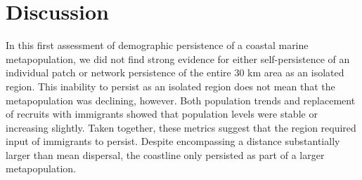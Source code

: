 \documentclass[12pt, oneside]{article}   	%
\begin{document}

\section*{Discussion}

In this first assessment of demographic persistence of a coastal marine metapopulation, we did not find strong evidence for either self-persistence of an individual patch or network persistence of the entire 30 km area as an isolated region. This inability to persist as an isolated region does not mean that the metapopulation was declining, however. Both population trends and replacement of recruits with immigrants showed that population levels were stable or increasing slightly. Taken together, these metrics suggest that the region required input of immigrants to persist. Despite encompassing a distance substantially larger than mean dispersal, the coastline only persisted as part of a larger metapopulation.
\end{document}
